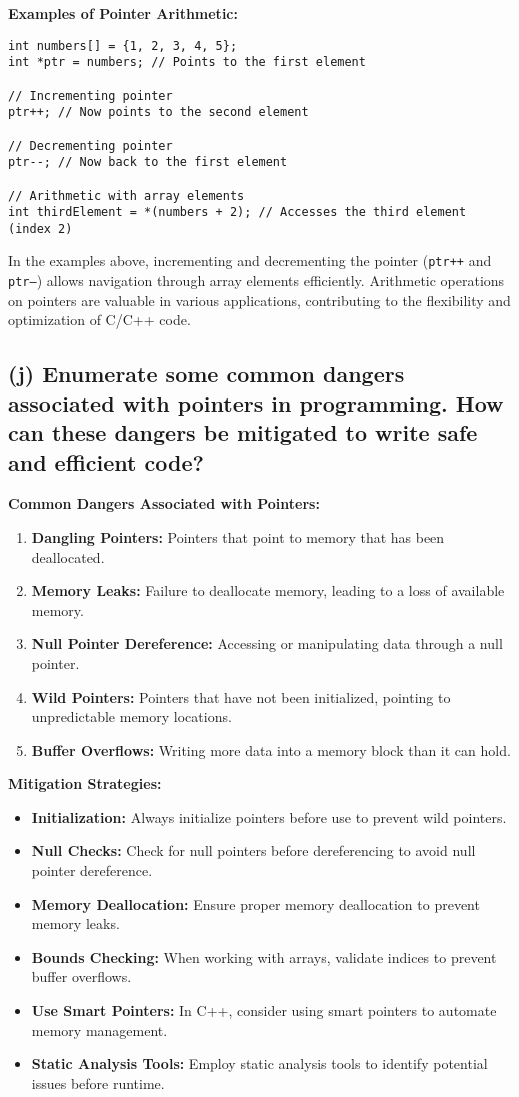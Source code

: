 \documentclass{article}
\begin{document}
\begin{enumerate}
\textbf{Examples of Pointer Arithmetic:}
\begin{verbatim}
int numbers[] = {1, 2, 3, 4, 5};
int *ptr = numbers; // Points to the first element

// Incrementing pointer
ptr++; // Now points to the second element

// Decrementing pointer
ptr--; // Now back to the first element

// Arithmetic with array elements
int thirdElement = *(numbers + 2); // Accesses the third element (index 2)
\end{verbatim}

In the examples above, incrementing and decrementing the pointer (\texttt{ptr++} and \texttt{ptr--}) allows navigation through array elements efficiently. Arithmetic operations on pointers are valuable in various applications, contributing to the flexibility and optimization of C/C++ code.
\subsection*{(j) Enumerate some common dangers associated with pointers in programming. How can these dangers be mitigated to write safe and efficient code?}

\textbf{Common Dangers Associated with Pointers:}
\begin{enumerate}
    \item \textbf{Dangling Pointers:} Pointers that point to memory that has been deallocated.
    \item \textbf{Memory Leaks:} Failure to deallocate memory, leading to a loss of available memory.
    \item \textbf{Null Pointer Dereference:} Accessing or manipulating data through a null pointer.
    \item \textbf{Wild Pointers:} Pointers that have not been initialized, pointing to unpredictable memory locations.
    \item \textbf{Buffer Overflows:} Writing more data into a memory block than it can hold.
\end{enumerate}

\textbf{Mitigation Strategies:}
\begin{itemize}
    \item \textbf{Initialization:} Always initialize pointers before use to prevent wild pointers.
    \item \textbf{Null Checks:} Check for null pointers before dereferencing to avoid null pointer dereference.
    \item \textbf{Memory Deallocation:} Ensure proper memory deallocation to prevent memory leaks.
    \item \textbf{Bounds Checking:} When working with arrays, validate indices to prevent buffer overflows.
    \item \textbf{Use Smart Pointers:} In C++, consider using smart pointers to automate memory management.
    \item \textbf{Static Analysis Tools:} Employ static analysis tools to identify potential issues before runtime.
\end{itemize}


\end{enumerate}
\end{document}
